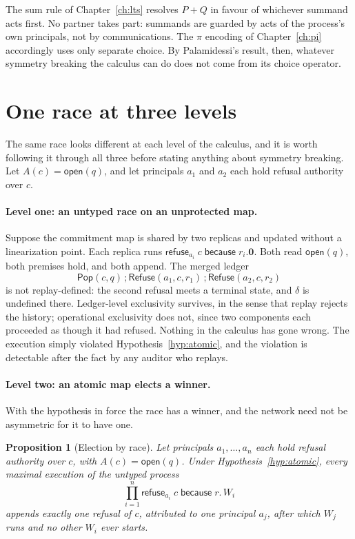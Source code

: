 \documentclass[11pt,openany]{book}
\newtheorem{proposition}[theorem]{Proposition}
\theoremstyle{remark}
\newcommand{\Pop}{\mathsf{Pop}}
\newcommand{\Refuse}{\mathsf{Refuse}}
\begin{document}
The sum rule of Chapter~\ref{ch:lts} resolves $P+Q$ in favour of
whichever summand acts first. No partner takes part: summands are
guarded by acts of the process's own principals, not by communications.
The $\pi$ encoding of Chapter~\ref{ch:pi} accordingly uses only
separate choice. By Palamidessi's result, then, whatever symmetry breaking
the calculus can do does not come from its choice operator.

\section{One race at three levels}

The same race looks different at each level of the calculus, and it is
worth following it through all three before stating anything about
symmetry breaking. Let $A(c)=\mathsf{open}(q)$, and let principals $a_1$ and
$a_2$ each hold refusal authority over $c$.

\paragraph{Level one: an untyped race on an unprotected map.} Suppose
the commitment map is shared by two replicas and updated without a
linearization point. Each replica runs
$\mathsf{refuse}_{a_i}\;c\;\mathsf{because}\;r_i.\mathbf 0$. Both read
$\mathsf{open}(q)$, both premises hold, and both append. The merged ledger
\[
\Pop(c,q)\,;\Refuse(a_1,c,r_1)\,;\Refuse(a_2,c,r_2)
\]
is not replay-defined: the second refusal meets a terminal state, and
$\delta$ is undefined there. Ledger-level exclusivity survives, in the
sense that replay rejects the history; operational exclusivity does not,
since two components each proceeded as though it had refused. Nothing in
the calculus has gone wrong. The execution simply violated
Hypothesis~\ref{hyp:atomic}, and the violation is detectable after the
fact by any auditor who replays.

\paragraph{Level two: an atomic map elects a winner.} With the
hypothesis in force the race has a winner, and the network need not be
asymmetric for it to have one.

\begin{proposition}[Election by race]\label{prop:race}
Let principals $a_1,\ldots,a_n$ each hold refusal authority over $c$, with
$A(c)=\mathsf{open}(q)$. Under Hypothesis~\ref{hyp:atomic}, every
maximal execution of the untyped process
\[
\prod_{i=1}^{n}\mathsf{refuse}_{a_i}\;c\;\mathsf{because}\;r.\,W_i
\]
appends exactly one refusal of $c$, attributed to one principal $a_j$,
after which $W_j$ runs and no other $W_i$ ever starts.
\end{proposition}
\end{document}
